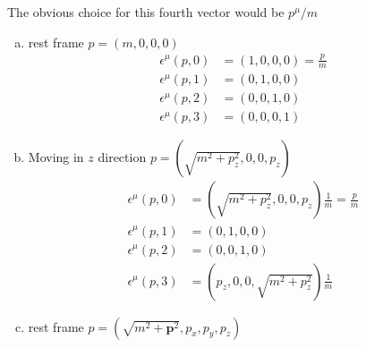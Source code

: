 \documentclass[10pt,a4paper]{report}
\theoremstyle{definition}
\begin{document}
The obvious choice for this fourth vector would be $p^\mu/m$
\begin{enumerate}[(a)]
\item rest frame $p=(m,0,0,0)$
\begin{align}
\epsilon^\mu(p,0)&=(1,0,0,0)=\frac{p}{m}\\
\epsilon^\mu(p,1)&=(0,1,0,0)\\
\epsilon^\mu(p,2)&=(0,0,1,0)\\
\epsilon^\mu(p,3)&=(0,0,0,1)
\end{align}

\item Moving in $z$ direction $p=(\sqrt{m^2+p_z^2},0,0,p_z)$
\begin{align}
\epsilon^\mu(p,0)&=(\sqrt{m^2+p_z^2},0,0,p_z)\frac{1}{m}=\frac{p}{m}\\
\epsilon^\mu(p,1)&=(0,1,0,0)\\
\epsilon^\mu(p,2)&=(0,0,1,0)\\
\epsilon^\mu(p,3)&=(p_z,0,0,\sqrt{m^2+p_z^2})\frac{1}{m}
\end{align}

\item rest frame $p=(\sqrt{m^2+\mathbf{p}^2},p_x,p_y,p_z)$

\end{enumerate}
\end{document}
